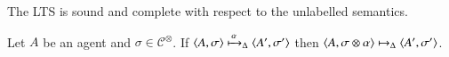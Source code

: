 \documentclass[main.tex]{subfiles}
\begin{document}
The LTS is sound and complete with respect to the unlabelled semantics. 


\begin{lemma}[Soundness]\label{lemma:soundness}
Let $A$ be an agent and $\sigma \in \mathcal{C}^\otimes$.
%
If $\langle A,\sigma \rangle \xmapsto{\,\alpha\,}_\Delta \langle A',\sigma' \rangle$ then $\langle A,\sigma \otimes \alpha \rangle  \mapsto_\Delta \langle A',\sigma' \rangle$.
\end{lemma}
\end{document}
